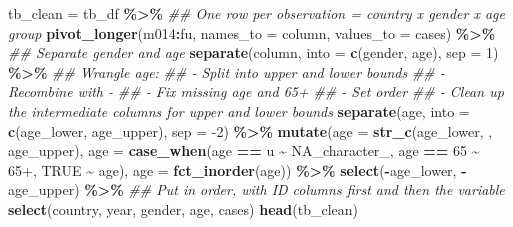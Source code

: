 \documentclass[
]{article}
\newenvironment{Shaded}{\begin{snugshade}}{\end{snugshade}}
\newcommand{\CommentTok}[1]{\textcolor[rgb]{0.56,0.35,0.01}{\textit{#1}}}
\newcommand{\DataTypeTok}[1]{\textcolor[rgb]{0.13,0.29,0.53}{#1}}
\newcommand{\DecValTok}[1]{\textcolor[rgb]{0.00,0.00,0.81}{#1}}
\newcommand{\KeywordTok}[1]{\textcolor[rgb]{0.13,0.29,0.53}{\textbf{#1}}}
\newcommand{\NormalTok}[1]{#1}
\newcommand{\OperatorTok}[1]{\textcolor[rgb]{0.81,0.36,0.00}{\textbf{#1}}}
\newcommand{\OtherTok}[1]{\textcolor[rgb]{0.56,0.35,0.01}{#1}}
\newcommand{\StringTok}[1]{\textcolor[rgb]{0.31,0.60,0.02}{#1}}
\begin{document}
\begin{Shaded}
\begin{Highlighting}[]
\NormalTok{tb\_clean =}\StringTok{ }\NormalTok{tb\_df }\OperatorTok{\%\textgreater{}\%}\StringTok{ }
\StringTok{    }\CommentTok{\#\# One row per observation = country x gender x age group}
\StringTok{    }\KeywordTok{pivot\_longer}\NormalTok{(m014}\OperatorTok{:}\NormalTok{fu, }
                 \DataTypeTok{names\_to =} \StringTok{\textquotesingle{}column\textquotesingle{}}\NormalTok{, }
                 \DataTypeTok{values\_to =} \StringTok{\textquotesingle{}cases\textquotesingle{}}\NormalTok{) }\OperatorTok{\%\textgreater{}\%}\StringTok{ }
\StringTok{    }\CommentTok{\#\# Separate gender and age}
\StringTok{    }\KeywordTok{separate}\NormalTok{(column, }\DataTypeTok{into =} \KeywordTok{c}\NormalTok{(}\StringTok{\textquotesingle{}gender\textquotesingle{}}\NormalTok{, }\StringTok{\textquotesingle{}age\textquotesingle{}}\NormalTok{), }
             \DataTypeTok{sep =} \DecValTok{1}\NormalTok{) }\OperatorTok{\%\textgreater{}\%}\StringTok{ }
\StringTok{    }\CommentTok{\#\# Wrangle age: }
\StringTok{    }\CommentTok{\#\# {-} Split into upper and lower bounds}
\StringTok{    }\CommentTok{\#\# {-} Recombine with {-}}
\StringTok{    }\CommentTok{\#\# {-} Fix missing age and 65+}
\StringTok{    }\CommentTok{\#\# {-} Set order}
\StringTok{    }\CommentTok{\#\# {-} Clean up the intermediate columns for upper and lower bounds}
\StringTok{    }\KeywordTok{separate}\NormalTok{(age, }\DataTypeTok{into =} \KeywordTok{c}\NormalTok{(}\StringTok{\textquotesingle{}age\_lower\textquotesingle{}}\NormalTok{, }\StringTok{\textquotesingle{}age\_upper\textquotesingle{}}\NormalTok{), }
             \DataTypeTok{sep =} \DecValTok{{-}2}\NormalTok{) }\OperatorTok{\%\textgreater{}\%}\StringTok{ }
\StringTok{    }\KeywordTok{mutate}\NormalTok{(}\DataTypeTok{age =} \KeywordTok{str\_c}\NormalTok{(age\_lower, }\StringTok{\textquotesingle{}{-}\textquotesingle{}}\NormalTok{, age\_upper), }
           \DataTypeTok{age =} \KeywordTok{case\_when}\NormalTok{(age }\OperatorTok{==}\StringTok{ \textquotesingle{}{-}u\textquotesingle{}}  \OperatorTok{\textasciitilde{}}\StringTok{ }\OtherTok{NA\_character\_}\NormalTok{, }
\NormalTok{                           age }\OperatorTok{==}\StringTok{ \textquotesingle{}{-}65\textquotesingle{}} \OperatorTok{\textasciitilde{}}\StringTok{ \textquotesingle{}65+\textquotesingle{}}\NormalTok{, }
                           \OtherTok{TRUE}         \OperatorTok{\textasciitilde{}}\StringTok{ }\NormalTok{age), }
           \DataTypeTok{age =} \KeywordTok{fct\_inorder}\NormalTok{(age)) }\OperatorTok{\%\textgreater{}\%}\StringTok{ }
\StringTok{    }\KeywordTok{select}\NormalTok{(}\OperatorTok{{-}}\NormalTok{age\_lower, }\OperatorTok{{-}}\NormalTok{age\_upper) }\OperatorTok{\%\textgreater{}\%}\StringTok{ }
\StringTok{    }\CommentTok{\#\# Put in order, with ID columns first and then the variable}
\StringTok{    }\KeywordTok{select}\NormalTok{(country, year, gender, age, cases)}
\KeywordTok{head}\NormalTok{(tb\_clean)}
\end{Highlighting}
\end{Shaded}
\end{document}
